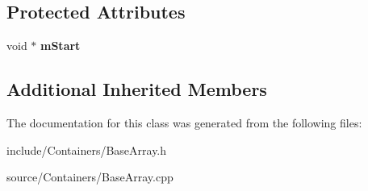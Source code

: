 \subsection*{Protected Attributes}
\begin{DoxyCompactItemize}
\item 
void $\ast$ {\bfseries m\+Start}\hypertarget{classDE_1_1BaseArray_a75351ce437cb954191bd17e6ca722a9c}{}\label{classDE_1_1BaseArray_a75351ce437cb954191bd17e6ca722a9c}

\end{DoxyCompactItemize}
\subsection*{Additional Inherited Members}


The documentation for this class was generated from the following files\+:\begin{DoxyCompactItemize}
\item 
include/\+Containers/Base\+Array.\+h\item 
source/\+Containers/Base\+Array.\+cpp\end{DoxyCompactItemize}
